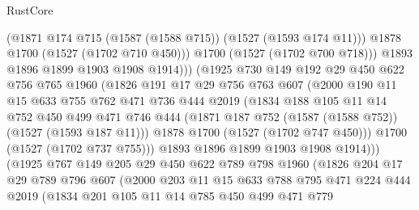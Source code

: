 \begin{lexlean}{RustCore}
\begin{coremodule}
                        (@1871 @174 @715 (@1587 (@1588 @715)) (@1527 (@1593 @174 @11)))
                        @1878
                        @1700
                        (@1527 (@1702 @710 @450)))
                      @1700
                      (@1527 (@1702 @700 @718)))
                    @1893
                    @1896
                    @1899
                    @1903
                    @1908
                    @1914)))
              (@1925
                @730
                @149
                @192
                @29
                @450
                @622
                @756
                @765
                @1960
                (@1826
                  @191
                  @17
                  @29
                  @756
                  @763
                  @607
                  (@2000
                    @190
                    @11
                    @15
                    @633
                    @755
                    @762
                    @471
                    @736
                    @444
                    @2019
                    (@1834
                      @188
                      @105
                      @11
                      @14
                      @752
                      @450
                      @499
                      @471
                      @746
                      @444
                      (@1871 @187 @752 (@1587 (@1588 @752)) (@1527 (@1593 @187 @11)))
                      @1878
                      @1700
                      (@1527 (@1702 @747 @450)))
                    @1700
                    (@1527 (@1702 @737 @755)))
                  @1893
                  @1896
                  @1899
                  @1903
                  @1908
                  @1914)))
            (@1925
              @767
              @149
              @205
              @29
              @450
              @622
              @789
              @798
              @1960
              (@1826
                @204
                @17
                @29
                @789
                @796
                @607
                (@2000
                  @203
                  @11
                  @15
                  @633
                  @788
                  @795
                  @471
                  @224
                  @444
                  @2019
                  (@1834
                    @201
                    @105
                    @11
                    @14
                    @785
                    @450
                    @499
                    @471
                    @779

\end{coremodule}
\end{lexlean}
